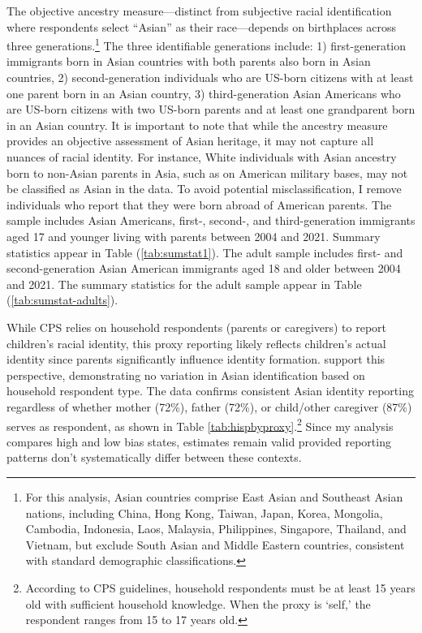 The objective ancestry measure—distinct from subjective racial identification where respondents select ``Asian'' as their race—depends on birthplaces across three generations.\footnote{For this analysis, Asian countries comprise East Asian and Southeast Asian nations, including China, Hong Kong, Taiwan, Japan, Korea, Mongolia, Cambodia, Indonesia, Laos, Malaysia, Philippines, Singapore, Thailand, and Vietnam, but exclude South Asian and Middle Eastern countries, consistent with standard demographic classifications.} The three identifiable generations include: 1) first-generation immigrants born in Asian countries with both parents also born in Asian countries, 2) second-generation individuals who are US-born citizens with at least one parent born in an Asian country, 3) third-generation Asian Americans who are US-born citizens with two US-born parents and at least one grandparent born in an Asian country. It is important to note that while the ancestry measure provides an objective assessment of Asian heritage, it may not capture all nuances of racial identity. For instance, White individuals with Asian ancestry born to non-Asian parents in Asia, such as on American military bases, may not be classified as Asian in the data. To avoid potential misclassification, I remove individuals who report that they were born abroad of American parents. The sample includes Asian Americans, first-, second-, and third-generation immigrants aged 17 and younger living with parents between 2004 and 2021. Summary statistics appear in Table (\ref{tab:sumstat1}). The adult sample includes first- and second-generation Asian American immigrants aged 18 and older between 2004 and 2021. The summary statistics for the adult sample appear in Table (\ref{tab:sumstat-adults}). 

While CPS relies on household respondents (parents or caregivers) to report children's racial identity, this proxy reporting likely reflects children's actual identity since parents significantly influence identity formation. \textcite{duncanIntermarriageIntergenerationalTransmission2011} support this perspective, demonstrating no variation in Asian identification based on household respondent type. The data confirms consistent Asian identity reporting regardless of whether mother (72\%), father (72\%), or child/other caregiver (87\%) serves as respondent, as shown in Table \ref{tab:hispbyproxy}.\footnote{According to CPS guidelines, household respondents must be at least 15 years old with sufficient household knowledge. When the proxy is `self,' the respondent ranges from 15 to 17 years old.} Since my analysis compares high and low bias states, estimates remain valid provided reporting patterns don't systematically differ between these contexts.

